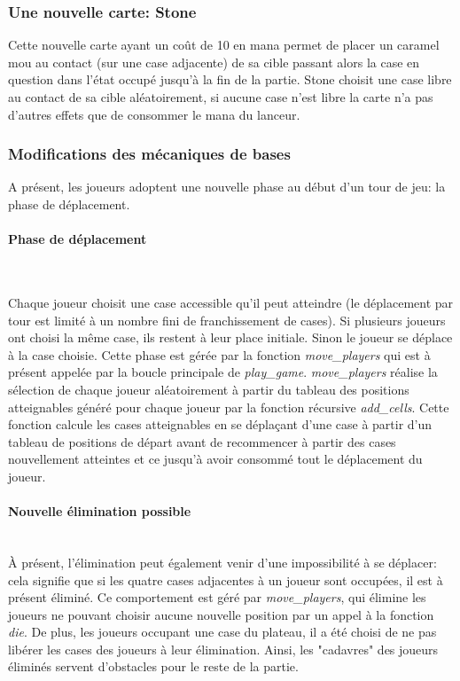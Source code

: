 \documentclass[12pt]{article}
\begin{document}
\subsubsection{Une nouvelle carte: Stone}
Cette nouvelle carte ayant un coût de 10 en mana permet de placer un caramel mou au contact (sur une case adjacente) de sa cible passant alors la case en question dans l'état occupé jusqu'à la fin de la partie.
Stone choisit une case libre au contact de sa cible aléatoirement, si aucune case n'est libre la carte n'a pas d'autres effets que de consommer le mana du lanceur.
\subsubsection{Modifications des mécaniques de bases}
A présent, les joueurs adoptent une nouvelle phase au début d'un tour de jeu: la phase de déplacement.
\smallbreak
\paragraph{Phase de déplacement} ~\\
\smallbreak

Chaque joueur choisit une case accessible qu'il peut atteindre (le déplacement par tour est limité à un nombre fini de franchissement de cases).
Si plusieurs joueurs ont choisi la même case, ils restent à leur place initiale. Sinon le joueur se déplace à la case choisie.
Cette phase est gérée par la fonction \textit{move\_players} qui est à présent appelée par la boucle principale de \textit{play\_game}.
\textit{move\_players} réalise la sélection de chaque joueur aléatoirement à partir du tableau des positions atteignables généré pour chaque joueur par la fonction récursive \textit{add\_cells}.
Cette fonction calcule les cases atteignables en se déplaçant d'une case à partir d'un tableau de positions de départ avant de recommencer à partir des cases nouvellement atteintes et ce jusqu'à avoir consommé tout le déplacement du joueur.
\smallbreak
\paragraph{Nouvelle élimination possible} ~\\
\smallbreak
À présent, l'élimination peut également venir d'une impossibilité à se déplacer: cela signifie que si les quatre cases adjacentes à un joueur sont occupées, il est à présent éliminé.
Ce comportement est géré par \textit{move\_players}, qui élimine les joueurs ne pouvant choisir aucune nouvelle position par un appel à la fonction \textit{die}.
De plus, les joueurs occupant une case du plateau, il a été choisi de ne pas libérer les cases des joueurs à leur élimination. Ainsi, les "cadavres" des joueurs éliminés servent d'obstacles pour le reste de la partie.
\end{document}
